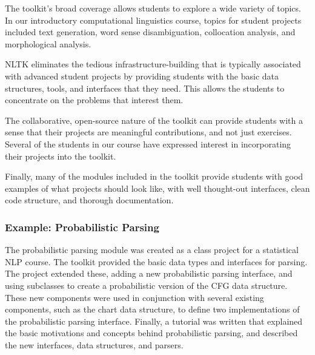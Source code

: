 \documentclass[11pt]{article}
\begin{document}
The toolkit's broad coverage allows students to explore a wide variety
of topics.  In our introductory computational linguistics course,
topics for student projects included text generation, word sense
disambiguation, collocation analysis, and morphological analysis.

NLTK eliminates the tedious infrastructure-building that is typically
associated with advanced student projects by providing students with
the basic data structures, tools, and interfaces that they need.  This
allows the students to concentrate on the problems that interest them.

The collaborative, open-source nature of the toolkit can provide
students with a sense that their projects are meaningful
contributions, and not just exercises.  Several of the students in our
course have expressed interest in incorporating their projects into
the toolkit.

Finally, many of the modules included in the toolkit provide students
with good examples of what projects should look like, with well
thought-out interfaces, clean code structure, and thorough
documentation.

\subsubsection*{Example: Probabilistic Parsing}

The probabilistic parsing module was created as a class project for a
statistical NLP course.  The toolkit provided the basic data types and
interfaces for parsing.  The project extended these, adding a new
probabilistic parsing interface, and using subclasses to create a
probabilistic version of the CFG data structure.  These new components
were used in conjunction with several existing components, such as the
chart data structure, to define two implementations of the
probabilistic parsing interface.  Finally, a tutorial was written that
explained the basic motivations and concepts behind probabilistic
parsing, and described the new interfaces, data structures, and
parsers.

\end{document}
